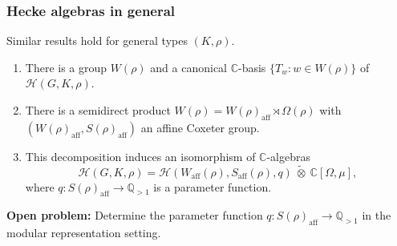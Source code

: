 \documentclass{beamer}
\newcommand{\PGL}{\mathrm{PGL}}
\newcommand{\SL}{\mathrm{SL}}
\newcommand{\aff}{\mathrm{aff}}
\newcommand{\CC}{\mathbb{C}}
\newcommand{\QQ}{\mathbb{Q}}
\newcommand{\cH}{\mathcal{H}}
\theoremstyle{plain}
\begin{document}
\begin{frame}
    \frametitle{Hecke algebras in general}
    Similar results hold for general types $(K,\rho)$. \pause
    \begin{enumerate}
        \item There is a group $W(\rho)$ and a canonical $\CC$-basis $\{T_w:w\in W(\rho)\}$ of $\cH(G,K,\rho)$. \pause
        \item There is a semidirect product $W(\rho)=W(\rho)_{\aff}\rtimes\Omega(\rho)$ with $(W(\rho)_{\aff},S(\rho)_{\aff})$ an affine Coxeter group. \pause
        \item This decomposition induces an isomorphism of $\CC$-algebras
        \[\cH(G,K,\rho)=\cH(W_{\aff}(\rho),S_{\aff}(\rho),q)\ \tilde{\otimes}\ \CC[\Omega,\mu],\]
        where $q:S(\rho)_{\aff}\rightarrow\QQ_{>1}$ is a parameter function.
    \end{enumerate}
    \vspace{0.3cm}\pause
    \textbf{Open problem:} Determine the parameter function $q:S(\rho)_{\aff}\rightarrow\QQ_{>1}$ in the modular representation setting. 
\end{frame}

\iffalse
\begin{frame}
    \frametitle{Unramified Langlands correspondence for $\SL_n(F)$}
    For simplicity, we assume now that $G=\SL_n(F)$.
    The work of Kazhdan--Lusztig and Reeder gives a complete classification of the irreducible modules of $\cH_n=\cH(\SL_n(F),I,\textbf{1})=C_c(I\backslash\SL_n(F)/I)$:
    \begin{itemize}
        \item For each $x\in\PGL_n(\CC)=G^\vee(\CC)$, we construct a canonical representation $V_x$ of $\cH_n$ using Borel--Moore homology.
        \item All irreducible $\cH_n$-modules are parametrized by pairs $(x,\phi)$ up to $G^\vee$-conjugacy, where $\phi$ is a character of $Z_{G^\vee}(x)/Z_{G^\vee}(x)^0$, and $\pi(x,\phi)$ is an irreducible subquotient of $V_x$.
        \item The set $G^\vee\backslash\{(x,\phi)\}$ can easily be seen to be in correspondence with \textbf{enhanced} Langlands parameters $(\varphi,\phi)$, $\varphi:W_F\times\SL_2(\CC)\rightarrow G^\vee$
    \end{itemize}
\end{frame}
\fi
\end{document}
